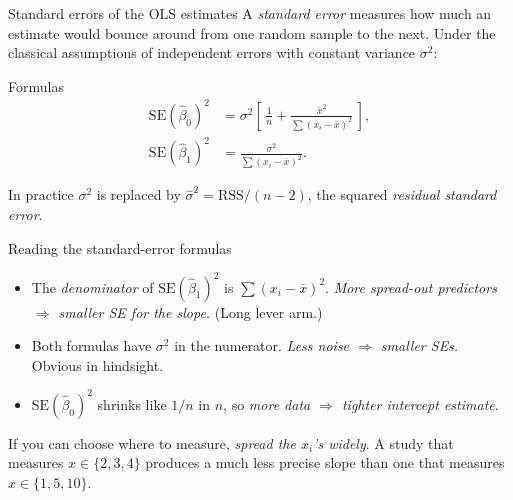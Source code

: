 \documentclass[aspectratio=169,11pt]{beamer}
\begin{document}
\begin{frame}{Standard errors of the OLS estimates}
  A \emph{standard error} measures how much an estimate would bounce
  around from one random sample to the next. Under the classical
  assumptions of independent errors with constant variance $\sigma^2$:
  \begin{block}{Formulas}
    \begin{align*}
      \mathrm{SE}(\hat\beta_0)^2
        &= \sigma^2\!\left[\,\tfrac{1}{n} +
            \tfrac{\bar x^2}{\sum (x_i - \bar x)^2}\,\right], \\[2pt]
      \mathrm{SE}(\hat\beta_1)^2
        &= \frac{\sigma^2}{\sum (x_i - \bar x)^2}.
    \end{align*}
  \end{block}
  In practice $\sigma^2$ is replaced by
  $\hat\sigma^2 = \mathrm{RSS}/(n-2)$, the squared
  \emph{residual standard error}.
\end{frame}

\begin{frame}{Reading the standard-error formulas}
  \begin{readme}
    \begin{itemize}
      \item The \emph{denominator} of $\mathrm{SE}(\hat\beta_1)^2$ is
            $\sum (x_i - \bar x)^2$. \emph{More spread-out predictors
            $\Rightarrow$ smaller SE for the slope.} (Long lever arm.)
      \item Both formulas have $\sigma^2$ in the numerator. \emph{Less
            noise $\Rightarrow$ smaller SEs.} Obvious in hindsight.
      \item $\mathrm{SE}(\hat\beta_0)^2$ shrinks like $1/n$ in $n$, so
            \emph{more data $\Rightarrow$ tighter intercept estimate}.
    \end{itemize}
  \end{readme}
  \begin{takeaway}
    If you can choose where to measure, \emph{spread the $x_i$'s widely}.
    A study that measures $x \in \{2, 3, 4\}$ produces a much less
    precise slope than one that measures $x \in \{1, 5, 10\}$.
  \end{takeaway}
\end{frame}
\end{document}
